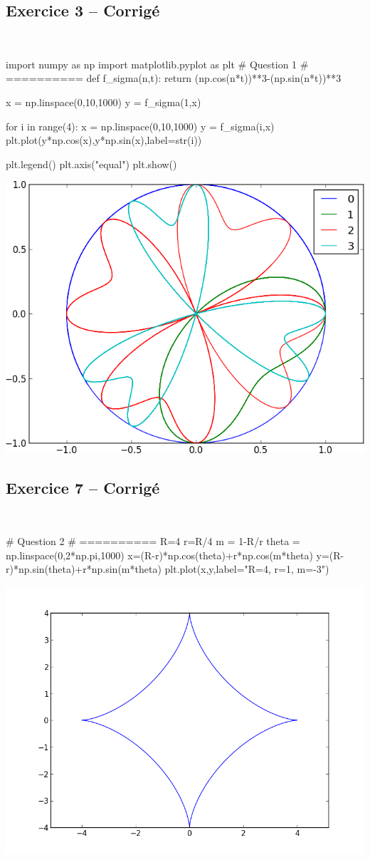 \documentclass[10pt,fleqn]{article} %
\begin{document}
{}
\subsection*{Exercice 3 -- Corrigé}

\begin{corrige}
$\quad$
\begin{python}
import numpy as np
import matplotlib.pyplot as plt
# Question 1 
# ==========
def f_sigma(n,t):
    return (np.cos(n*t))**3-(np.sin(n*t))**3

x = np.linspace(0,10,1000)
y = f_sigma(1,x)

for i in range(4):
    x = np.linspace(0,10,1000)
    y = f_sigma(i,x)
    plt.plot(y*np.cos(x),y*np.sin(x),label=str(i))

plt.legend()
plt.axis("equal")    
plt.show()
\end{python}
\end{corrige}
\begin{center}
\includegraphics[width=.4\linewidth]{images/exo_FB_03}
\end{center}

{}
\subsection*{Exercice 7 -- Corrigé}

\begin{corrige}
$\quad$
\begin{python}
# Question 2
# ==========
R=4
r=R/4
m = 1-R/r
theta = np.linspace(0,2*np.pi,1000)
x=(R-r)*np.cos(theta)+r*np.cos(m*theta)
y=(R-r)*np.sin(theta)+r*np.sin(m*theta)
plt.plot(x,y,label="R=4, r=1, m=-3")
\end{python}
\end{corrige}

\begin{center}
\includegraphics[width=.4\linewidth]{images/exo_FB_07_1}
\end{center}
\end{document}
